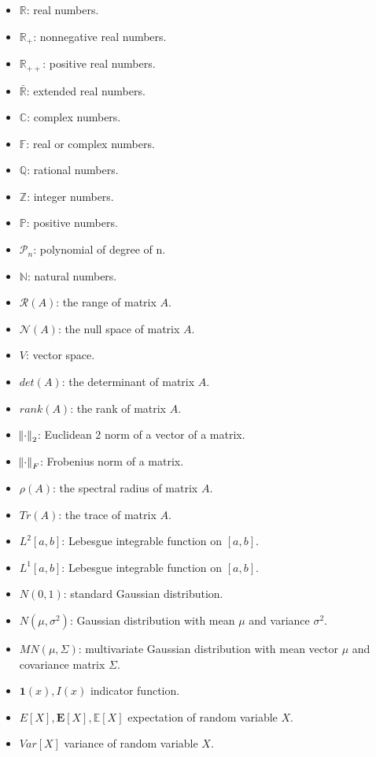 \documentclass[oneside,hidelinks,12pt,letterpaper]{scrbook} %
\newcommand{\field}[1]  {\mathbb{#1}}
\newcommand{\R}{\mathbb{R}}
\newcommand{\RE}{\bar{\mathbb{R}}}
\newcommand{\F}{\mathbb{F}}
\newcommand{\PP}{\mathbb{P}}
\newcommand{\N}         {\field N}
\newcommand{\Z}         {\field Z}
\newcommand{\C}         {\field C}
\newcommand{\Q}         {\field Q}
\newcommand{\cP}{\mathcal{P}}
\newcommand{\cR}{\mathcal{R}}
\newcommand{\cN}{\mathcal{N}}
\theoremstyle{remark}
\theoremstyle{coloredRemark}
\theoremstyle{coloredNote}
\begin{document}
\begin{itemize}
	\item $\R$: real numbers.
	\item $\R_+$: nonnegative real numbers.
	\item $\R_{++}$: positive real numbers.
	\item $\RE$: extended real numbers.
	\item $\C$: complex numbers.
	\item $\F$: real or complex numbers.
	\item $\Q$: rational numbers.
	\item $\Z$: integer numbers.
	\item $\PP$: positive numbers.
	\item $\cP_n$: polynomial of degree of n.
	\item $\N$: natural numbers.
	\item $\cR(A)$: the range of matrix $A$.
	\item $\cN(A)$: the null space of matrix $A$. 
		\item $V$: vector space.
		\item $det(A)$: the determinant of matrix $A$.
		\item $rank(A)$: the rank of matrix $A$.
		\item $\norm{\cdot}_2$: Euclidean 2 norm of a vector of a matrix.
		\item $\norm{\cdot}_F$: Frobenius norm of a matrix.
		\item $\rho(A)$: the spectral radius of matrix $A$.
		\item $Tr(A)$: the trace of matrix $A$.	
		\item $L^2[a,b]$: Lebesgue integrable function on $[a,b]$.
		\item $L^1[a,b]$: Lebesgue integrable function on $[a,b]$.
		\item $N(0,1)$: standard Gaussian distribution.
		\item $N(\mu,\sigma^2)$: Gaussian distribution with mean $\mu$ and variance $\sigma^2$.
		\item $MN(\mu,\Sigma)$: multivariate Gaussian distribution with mean vector $\mu$ and covariance matrix $\Sigma$.
		\item $\bm{1}(x), I(x)$ indicator function.
		\item $E[X], \mathbf{E}[X], \mathbb{E}[X]$ expectation of random variable $X$.
		\item $Var[X]$ variance of random variable $X$.
\end{itemize}
\end{document}
